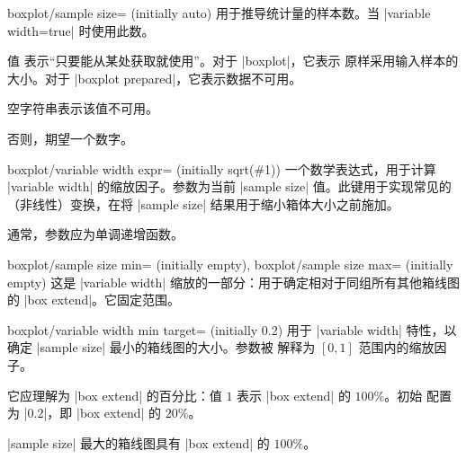 \begin{pgfplotskey}{boxplot/sample size= (initially auto)}
    用于推导统计量的样本数。当 |variable width=true| 时使用此数。

    值  表示“只要能从某处获取就使用”。对于 |boxplot|，它表示
    原样采用输入样本的大小。对于 |boxplot prepared|，它表示数据不可用。

    空字符串表示该值不可用。

    否则，期望一个数字。
\end{pgfplotskey}

\begin{pgfplotskey}{boxplot/variable width expr= (initially {sqrt(\#1)})}
    一个数学表达式，用于计算 |variable width| 的缩放因子。参数为当前
    |sample size| 值。此键用于实现常见的（非线性）变换，在将 |sample size|
    结果用于缩小箱体大小之前施加。

    通常，参数应为单调递增函数。
\end{pgfplotskey}

\begin{pgfplotskeylist}{%
    boxplot/sample size min= (initially empty),
    boxplot/sample size max= (initially empty)%
}
    这是 |variable width| 缩放的一部分：用于确定相对于同组所有其他箱线图的
    |box extend|。它固定范围。
\end{pgfplotskeylist}

\begin{pgfplotskey}{%
    boxplot/variable width min target= (initially 0.2)%
}
    用于 |variable width| 特性，以确定 |sample size| 最小的箱线图的大小。参数被
    解释为 $[0,1]$ 范围内的缩放因子。

    它应理解为 |box extend| 的百分比：值 $1$ 表示 |box extend| 的 $100\%$。初始
    配置为 |0.2|，即 |box extend| 的 $20\%$。

    |sample size| 最大的箱线图具有 |box extend| 的 $100\%$。
\end{pgfplotskey}

